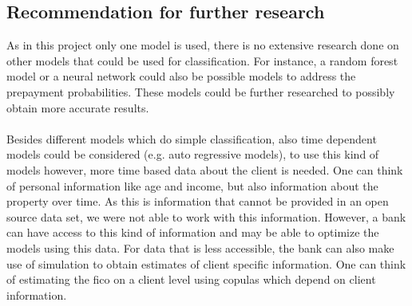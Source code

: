 \subsection{Recommendation for further research}
    As in this project only one model is used, there is no 
    extensive research done on other models that could be 
    used for classification. For instance, a random forest 
    model or a neural network could also be possible models 
    to address the prepayment probabilities. These models 
    could be 
    further researched to possibly obtain more accurate 
    results. 
    \\ \\
    Besides different models which do simple classification, 
    also time dependent models could be considered (e.g.
    auto regressive models), to use this kind of models 
    however, more time based data about the client is 
    needed. One can think of personal information like age
    and income, but also information about the property over 
    time. As this is information that cannot be provided in 
    an open source data set, we were not able to work with 
    this information. However, a bank can have access to 
    this kind of information and may be able to optimize
    the models using this data.
    For data that is less accessible, the bank can also 
    make use of simulation to obtain estimates of client 
    specific information. One can think of estimating the 
    fico on a client level using copulas which depend
    on client information. 